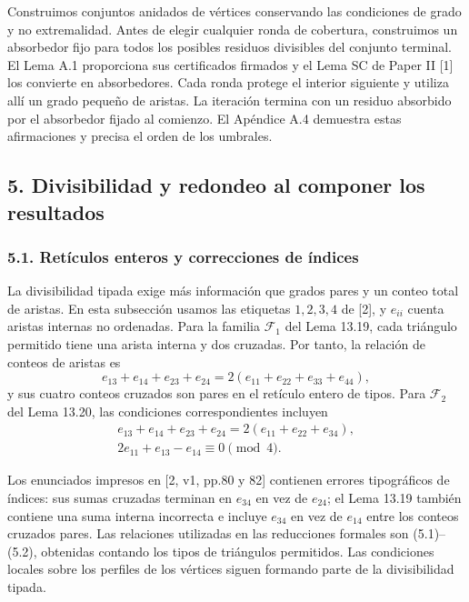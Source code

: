 \documentclass[spanish,11pt,a4paper]{article}
\begin{document}
Construimos conjuntos anidados de vértices conservando las condiciones de grado y no extremalidad. Antes de elegir cualquier ronda de cobertura, construimos un absorbedor fijo para todos los posibles residuos divisibles del conjunto terminal. El Lema A.1 proporciona sus certificados firmados y el Lema SC de Paper II {[}1{]} los convierte en absorbedores. Cada ronda protege el interior siguiente y utiliza allí un grado pequeño de aristas. La iteración termina con un residuo absorbido por el absorbedor fijado al comienzo. El Apéndice A.4 demuestra estas afirmaciones y precisa el orden de los umbrales.


\subsection{5. Divisibilidad y redondeo al componer los resultados}\label{divisibilidad-y-redondeo-al-componer-los-resultados}

\subsubsection{5.1. Retículos enteros y correcciones de índices}\label{retuxedculos-enteros-y-correcciones-de-uxedndices}

La divisibilidad tipada exige más información que grados pares y un conteo total de aristas. En esta subsección usamos las etiquetas \(1,2,3,4\) de {[}2{]}, y \(e_{ii}\) cuenta aristas internas no ordenadas. Para la familia \(\mathcal F_1\) del Lema 13.19, cada triángulo permitido tiene una arista interna y dos cruzadas. Por tanto, la relación de conteos de aristas es \[e_{13}+e_{14}+e_{23}+e_{24}
=2(e_{11}+e_{22}+e_{33}+e_{44}),
\tag{5.1}\] y sus cuatro conteos cruzados son pares en el retículo entero de tipos. Para \(\mathcal F_2\) del Lema 13.20, las condiciones correspondientes incluyen \[\begin{gathered}
e_{13}+e_{14}+e_{23}+e_{24}=2(e_{11}+e_{22}+e_{34}),\\
2e_{11}+e_{13}-e_{14}\equiv0\pmod4.
\end{gathered}
\tag{5.2}\]

Los enunciados impresos en {[}2, v1, pp.80 y 82{]} contienen errores tipográficos de índices: sus sumas cruzadas terminan en \(e_{34}\) en vez de \(e_{24}\); el Lema 13.19 también contiene una suma interna incorrecta e incluye \(e_{34}\) en vez de \(e_{14}\) entre los conteos cruzados pares. Las relaciones utilizadas en las reducciones formales son (5.1)--(5.2), obtenidas contando los tipos de triángulos permitidos. Las condiciones locales sobre los perfiles de los vértices siguen formando parte de la divisibilidad tipada.
\end{document}
